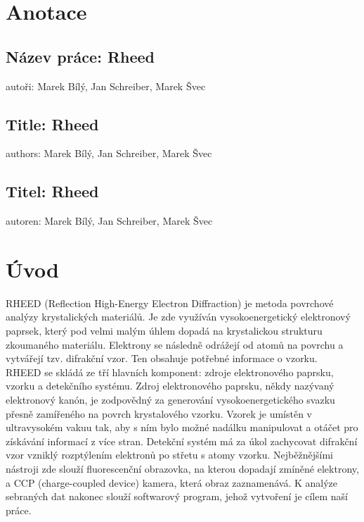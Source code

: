 \documentclass{article}
\begin{document}
\newpage

\section*{Anotace}

\subsection*{Název práce: Rheed}
autoři: Marek Bílý, Jan Schreiber, Marek Švec
\vspace{0.5cm}

\subsection*{Title: Rheed}
authors: Marek Bílý, Jan Schreiber, Marek Švec
\vspace{0.5cm}

\subsection*{Titel: Rheed}
autoren: Marek Bílý, Jan Schreiber, Marek Švec
\vspace{0.5cm}
\newpage
\section{Úvod}
    RHEED (Reflection High-Energy Electron Diffraction) je metoda povrchové analýzy krystalických materiálů. Je zde využíván vysokoenergetický elektronový paprsek, který pod velmi malým úhlem dopadá na krystalickou strukturu zkoumaného materiálu. Elektrony se následně odrážejí od atomů na povrchu a vytvářejí tzv. difrakční vzor. Ten obsahuje potřebné informace o vzorku.\\

    RHEED se skládá ze tří hlavních komponent: zdroje elektronového paprsku, vzorku a detekčního systému. Zdroj elektronového paprsku, někdy nazývaný elektronový kanón, je zodpovědný za generování vysokoenergetického svazku přesně zamířeného na povrch krystalového vzorku. Vzorek je umístěn v ultravysokém vakuu tak, aby s ním bylo možné nadálku manipulovat a otáčet pro získávání informací z více stran. Detekční systém má za úkol zachycovat difrakční vzor vzniklý rozptýlením elektronů po střetu s atomy vzorku. Nejběžnějšími nástroji zde slouží fluorescenční obrazovka, na kterou dopadají zmíněné elektrony, a CCP (charge-coupled device) kamera, která obraz zaznamenává. K analýze sebraných dat nakonec slouží softwarový program, jehož vytvoření je cílem naší práce.
    
\end{document}
